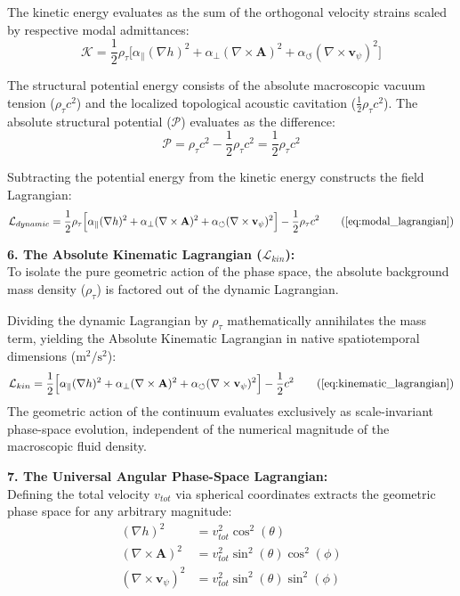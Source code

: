 \documentclass[11pt, a4paper]{article}
\begin{document}
The kinetic energy evaluates as the sum of the orthogonal velocity strains scaled by respective modal admittances:
\begin{equation}
    \mathcal{K} = \frac{1}{2} \rho_{\tau} \Big[ \alpha_{\parallel}(\nabla h)^2 + \alpha_{\perp}(\nabla \times \mathbf{A})^2 + \alpha_{\circlearrowleft}(\nabla \times \mathbf{v}_{\psi})^2 \Big] \nonumber
\end{equation}

The structural potential energy consists of the absolute macroscopic vacuum tension ($\rho_{\tau} c^2$) and the localized topological acoustic cavitation ($\frac{1}{2} \rho_{\tau} c^2$). The absolute structural potential ($\mathcal{P}$) evaluates as the difference:
\begin{equation}
    \mathcal{P} = \rho_{\tau} c^2 - \frac{1}{2} \rho_{\tau} c^2 = \frac{1}{2} \rho_{\tau} c^2 \nonumber
\end{equation}

Subtracting the potential energy from the kinetic energy constructs the field Lagrangian:
\begin{equation}
    \mathcal{L}_{dynamic} = \frac{1}{2} \rho_{\tau} \Big[ \alpha_{\parallel}(\nabla h)^2 + \alpha_{\perp}(\nabla \times \mathbf{A})^2 + \alpha_{\circlearrowleft}(\nabla \times \mathbf{v}_{\psi})^2 \Big] - \frac{1}{2} \rho_{\tau} c^2 \tag{\ref{eq:modal_lagrangian}}
\end{equation}

\textbf{6. The Absolute Kinematic Lagrangian ($\mathcal{L}_{kin}$):} \\
To isolate the pure geometric action of the phase space, the absolute background mass density ($\rho_{\tau}$) is factored out of the dynamic Lagrangian. 

Dividing the dynamic Lagrangian by $\rho_{\tau}$ mathematically annihilates the mass term, yielding the Absolute Kinematic Lagrangian in native spatiotemporal dimensions ($\text{m}^2/\text{s}^2$):
\begin{equation}
    \mathcal{L}_{kin} = \frac{1}{2} \Big[ \alpha_{\parallel}(\nabla h)^2 + \alpha_{\perp}(\nabla \times \mathbf{A})^2 + \alpha_{\circlearrowleft}(\nabla \times \mathbf{v}_{\psi})^2 \Big] - \frac{1}{2} c^2 \tag{\ref{eq:kinematic_lagrangian}}
\end{equation}
The geometric action of the continuum evaluates exclusively as scale-invariant phase-space evolution, independent of the numerical magnitude of the macroscopic fluid density.

\textbf{7. The Universal Angular Phase-Space Lagrangian:} \\
Defining the total velocity $v_{tot}$ via spherical coordinates extracts the geometric phase space for any arbitrary magnitude:
\begin{align}
    (\nabla h)^2 &= v_{tot}^2 \cos^2(\theta) \nonumber \\
    (\nabla \times \mathbf{A})^2 &= v_{tot}^2 \sin^2(\theta)\cos^2(\phi) \nonumber \\
    (\nabla \times \mathbf{v}_{\psi})^2 &= v_{tot}^2 \sin^2(\theta)\sin^2(\phi) \nonumber
\end{align}
\end{document}
